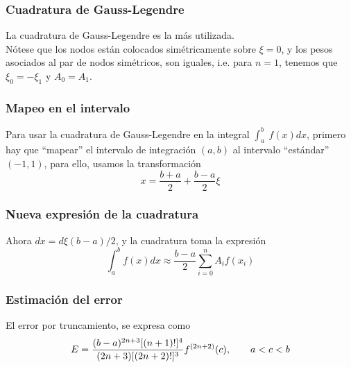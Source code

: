 \begin{frame}
\frametitle{Cuadratura de Gauss-Legendre}
La cuadratura de Gauss-Legendre es la más utilizada. 
\\
\bigskip
Nótese que los nodos están colocados simétricamente sobre $\xi=0$, y los pesos asociados al par de nodos simétricos, son iguales, i.e. para $n=1$, tenemos que $\xi_{0} = - \xi_{1}$ y $A_{0} = A_{1}$.
\end{frame}
\begin{frame}
\frametitle{Mapeo en el intervalo}
Para usar la cuadratura de Gauss-Legendre en la integral $\int_{a}^{b} \: f(x) dx$, primero hay que \enquote{mapear} el intervalo de integración $(a,b)$ al intervalo \enquote{estándar} $(-1, 1)$, para ello, usamos la transformación
\[ x = \dfrac{b + a}{2} + \dfrac{b - a}{2} \xi \]
\end{frame}
\begin{frame}
\frametitle{Nueva expresión de la cuadratura}
Ahora $dx = d \xi (b-a)/2$, y la cuadratura toma la expresión
\[ \int_{a}^{b} f(x) dx \approx \dfrac{b-a}{2} \sum_{i=0}^{n} A_{i} f(x_{i}) \]
\end{frame}
\begin{frame}
\frametitle{Estimación del error}
El error por truncamiento, se expresa como
\[ E = \dfrac{(b-a)^{2n+3} [(n+1)!]^{4}}{(2n+3)[(2n+2)!]^{3}} f^{(2n+2)} (c), \hspace{0.7cm} a<c<b \]
\end{frame}
